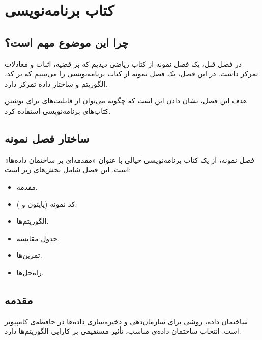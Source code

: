 
\chapter{کتاب برنامه‌نویسی}
\label{chap:programming-book}

\section{چرا این موضوع مهم است؟}
\label{sec:programming-book-why}

در فصل قبل، یک فصل نمونه از کتاب ریاضی
دیدیم که بر قضیه، اثبات و معادلات تمرکز
داشت. در این فصل، یک فصل نمونه از کتاب
برنامه‌نویسی را می‌بینیم که بر کد، الگوریتم
و ساختار داده تمرکز دارد.

هدف این فصل، نشان دادن این است که چگونه
می‌توان از قابلیت‌های  برای
نوشتن کتاب‌های برنامه‌نویسی استفاده کرد.


\section{ساختار فصل نمونه}
\label{sec:programming-book-structure}

فصل نمونه، از یک کتاب برنامه‌نویسی خیالی
با عنوان «مقدمه‌ای بر ساختمان داده‌ها»
است. این فصل شامل بخش‌های زیر است:

\begin{itemize}
    \item مقدمه.
    \item کد نمونه (پایتون و ).
    \item الگوریتم‌ها.
    \item جدول مقایسه.
    \item تمرین‌ها.
    \item راه‌حل‌ها.
\end{itemize}

\section{مقدمه}
\label{sec:programming-book-intro}

ساختمان داده، روشی برای
سازمان‌دهی و ذخیره‌سازی داده‌ها در حافظه‌ی
کامپیوتر است. انتخاب ساختمان داده‌ی مناسب،
تأثیر مستقیمی بر کارایی الگوریتم‌ها دارد.

